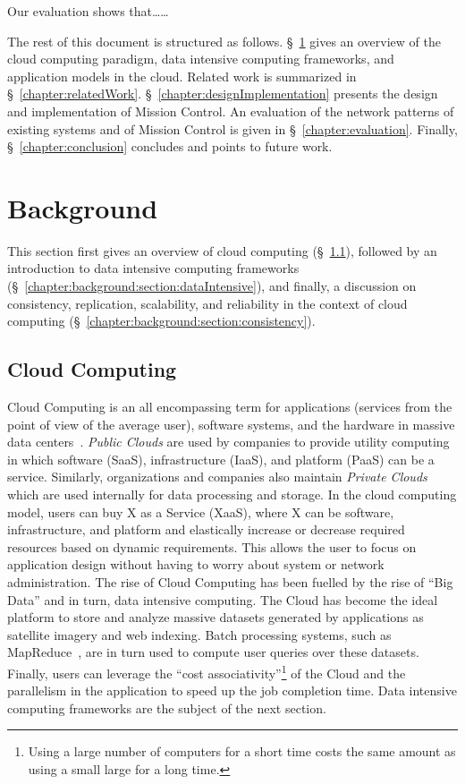\documentclass[a4paper,12pt,twoside,openright]{report}
\begin{document}
Our evaluation shows that\ldots\ldots

The rest of this document is structured as follows. \S~\ref{chapter:background}
gives an overview of the cloud computing paradigm, data intensive computing
frameworks, and application models in the cloud. Related work is summarized in
\S~\ref{chapter:relatedWork}.
\S~\ref{chapter:designImplementation} presents the design and implementation of
Mission Control. An evaluation of the network patterns of existing systems and
of Mission Control is given in \S~\ref{chapter:evaluation}. Finally,
\S~\ref{chapter:conclusion} concludes and points to future work.


\chapter{Background}\label{chapter:background}
This section first gives an overview of cloud computing
(\S~\ref{chapter:background:section:cloudComputing}), followed by an
introduction to data intensive computing frameworks
(\S~\ref{chapter:background:section:dataIntensive}), and finally, a discussion
on consistency, replication, scalability, and reliability in the context of
cloud computing (\S~\ref{chapter:background:section:consistency}).

\section{Cloud Computing}\label{chapter:background:section:cloudComputing}
Cloud Computing is an all encompassing term for applications (services from the
point of view of the average user), software systems, and the hardware in
massive data centers~\cite{Armbrust:2009:ATC}. \emph{Public Clouds} are used by
companies to provide utility computing in which software (SaaS), infrastructure
(IaaS), and platform (PaaS) can be a service. Similarly, organizations and
companies also maintain \emph{Private Clouds} which are used internally for data
processing and storage. In the cloud computing model, users can buy X as a
Service (XaaS), where X can be software, infrastructure, and platform and
elastically increase or decrease required resources based on dynamic
requirements. This allows the user to focus on application design without having
to worry about system or network administration. The rise of Cloud Computing has
been fuelled by the rise of ``Big Data'' and in turn, data intensive computing.
The Cloud has become the ideal platform to store and analyze massive datasets
generated by applications as satellite imagery and web indexing. Batch
processing systems, such as MapReduce~\cite{Dean:2004:MSD}, are in turn used to
compute user queries over these datasets. Finally, users can leverage the ``cost
associativity''\footnote{Using a large number of computers for a short time
costs the same amount as using a small large for a long time.} of the Cloud and
the parallelism in the application to speed up the job completion time. Data
intensive computing frameworks are the subject of the next section.
\end{document}
